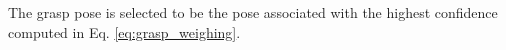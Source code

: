 The grasp pose is selected to be the pose associated with the highest confidence computed in Eq. \eqref{eq:grasp_weighing}.

